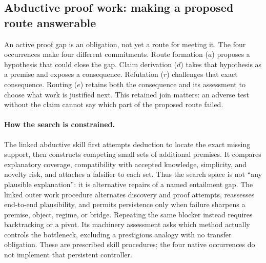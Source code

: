 %
%
%
\subsection{Abductive proof work: making a proposed route answerable}
\label{app:granular-abducer-work-loop}
An active proof gap is an obligation, not yet a route for meeting it. The four
occurrences make four different commitments. Route formation ($a$) proposes a
hypothesis that could close the gap. Claim derivation ($d$) takes that hypothesis
as a premise and exposes a consequence. Refutation ($r$) challenges that exact
consequence. Routing ($e$) retains both the consequence and its assessment to
choose what work is justified next. This retained join matters: an adverse test
without the claim cannot say which part of the proposed route failed.

\paragraph{How the search is constrained.}
The linked abductive skill first attempts deduction to locate the exact missing
support, then constructs competing small sets of additional premises. It compares
explanatory coverage, compatibility with accepted knowledge, simplicity, and
novelty risk, and attaches a falsifier to each set. Thus the search space is not
``any plausible explanation'': it is alternative repairs of a named entailment
gap. The linked outer work procedure alternates discovery and proof attempts,
reassesses end-to-end plausibility, and permits persistence only when failure
sharpens a premise, object, regime, or bridge. Repeating the same blocker instead
requires backtracking or a pivot. Its machinery assessment asks which method
actually controls the bottleneck, excluding a prestigious analogy with no
transfer obligation. These are prescribed skill procedures; the four native
occurrences do not implement that persistent controller.

